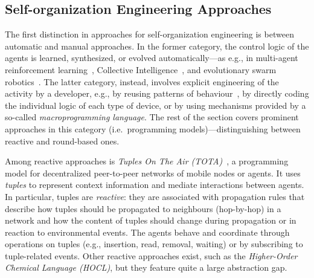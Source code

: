 \subsection{Self-organization Engineering Approaches}
\label{acsos2023-frp:sec:background:selforg}



The first distinction in approaches for self-organization engineering
 is between automatic 
 and manual approaches.
%
In the former category, 
 the control logic of the agents
 is learned, synthesized, or evolved automatically---as e.g., in multi-agent reinforcement learning~\cite{DBLP:journals/corr/abs-1911-10635},
 Collective Intelligence~\cite{tumer2004collectives,casadei2023artl-ci-survey},
 and evolutionary swarm robotics~\cite{trianni2008evolutionary-swarm}.
%
The latter category, instead,
 involves explicit engineering of the activity
 by a developer,
 e.g., by reusing patterns of behaviour~\cite{FDMVA-NACO2013}, by directly coding the individual logic of each type of device,
 or by using mechanisms provided by a so-called \emph{macroprogramming language}\cite{casadei2023macro,DBLP:journals/jisa/JuniorSBP21}.
%
The rest of the section covers prominent approaches in this category (i.e.\ programming models)---distinguishing between reactive and round-based ones.

Among reactive approaches is \emph{Tuples On The Air (TOTA)}~\cite{tota},
 a programming model for decentralized peer-to-peer networks of mobile nodes or agents.
%
It uses \emph{tuples} to represent context information 
 and mediate interactions between agents.
%
In particular, tuples are \emph{reactive}: they are associated with propagation rules that
describe how tuples should be propagated to neighbours (hop-by-hop) in a network and how the
content of tuples should change during propagation
 or in reaction to environmental events. 
%
The agents behave and coordinate
 through operations on tuples (e.g., insertion, read, removal, waiting) or by subscribing to tuple-related events.
%
Other reactive approaches exist, such as the \emph{Higher-Order Chemical Language (HOCL)}\cite{DBLP:journals/ijuc/BanatreFR07},
 but they feature quite a large abstraction gap.
%

